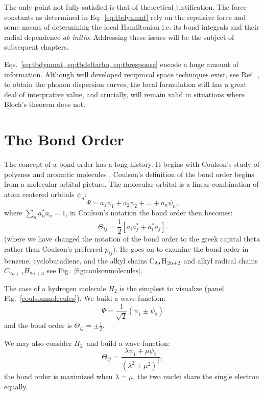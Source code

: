 The only point not fully satisfied is that of theoretical justification.
The force constants as determined in Eq.~\ref{eq:tbdynmat}
rely on the repulsive force and some means of determining 
the local Hamiltonian i.e. its bond integrals and their 
radial dependence {\it ab initio}. Addressing these issues
will be the subject of subsequent chapters. 
 
Eqs.~\ref{eq:tbdynmat, eq:tbdeltarho, eq:tbresponse} encode
a huge amount of information. Although well developed reciprocal space 
techniques exist, see Ref.~\cite{baroni01}, to obtain the phonon dispersion
curves, the local formulation still has a great deal of 
interprative value, and crucially, will remain valid
in situations where Bloch's theorem does not.

\section{The Bond Order}
The concept of a bond order has a long history.
It begins with Coulson's study of polyenes and aromatic 
molecules \cite{coulson39,coulson47}. Coulson's definition 
of the bond order begins from a molecular orbital picture. The molecular
orbital is a linear combination of atom centered orbitals $\psi_{n}$:
%
\begin{equation} 
\Psi = a_1\psi_1 + a_2\psi_{2} + ... +a_{n}\psi_{n},
\end{equation}
%
where $\sum_{n} a^{*}_{n}a_{n} = 1$, in Coulson's notation the bond order
then becomes:
%
\begin{equation}
\Theta_{ij}  = \frac{1}{2}[a_{i}a^{*}_{j} + a^{*}_{i}a_{j}].
\end{equation}
%
(where we have changed the notation of the bond order to the greek capital
theta rather than Coulson's preferred $p_{ij}$).
He goes on to examine the bond order in benzene, cyclobutadiene, 
and the alkyl chains C$_{\rm 2n}$H$_{\rm 2n+2}$ and alkyl radical chains 
$C_{2n+1}H_{2n+3}$ see Fig.~\ref{fig:coulsonmolecules}. 

The case of a hydrogen molecule $H_{2}$ is the simplest to 
visualize (panel Fig.~\ref{coulsonmolecules}). We build a wave function:
%
\begin{equation}
\Psi = \frac{1}{\sqrt 2}(\psi_{1} \pm \psi_{2})
\end{equation}
%
and the bond order is $\Theta_{ij} = \pm \frac{1}{2}$.

We may also consider $H_{2}^{+}$ and build a wave function:
%
\begin{equation}
\Theta_{ij} = \frac{\lambda\psi_{1} + \mu\psi_{2}}{(\lambda^{2} + \mu^{2})^{\frac{1}{2}}},
\end{equation}
%
the bond order is maximized when $\lambda=\mu$, the two nuclei share the 
single electron equally. 


